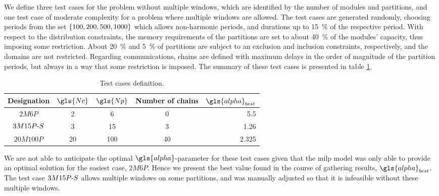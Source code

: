 \documentclass[main.tex]{subfiles}
\begin{document}
We define three test cases for the problem without multiple windows, which are identified by the number of modules and partitions, and one test case of moderate complexity for a problem where multiple windows are allowed.
The test cases are generated randomly, choosing periods from the set $\{100, 200, 500, 1000\}$ which allows non-harmonic periods, and durations up to \SI{15}{\percent} of the respective period.
With respect to the distribution constraints, the memory requirements of the partitions are set to about \SI{40}{\percent} of the modules' capacity, thus imposing some restriction.
About \SI{20}{\percent} and \SI{5}{\percent} of partitions are subject to an exclusion and inclusion constraints, respectively, and the domains are not restricted.
Regarding communications, chains are defined with maximum delays in the order of magnitude of the partition periods, but always in a way that some restriction is imposed.
The summary of these test cases is presented in table \ref{tab:cases}.
\begin{table}[htbp]
\centering
\caption{Test cases definition.}
\label{tab:cases}
\begin{tabular}{c c c c r}
    \toprule
    Designation & $\gls{Nc}$ & $\gls{Np}$ & Number of chains & $\gls{alpha}_{best}$ \\
    \midrule
    $2M6P$             & \num{2}  & \num{6}   & \num{0}  & \num{5.5}   \\
    $3M15P\text{-} S$ & \num{3}  & \num{15}  & \num{3}  & \num{1.26}  \\
    $20M100P$          & \num{20} & \num{100} & \num{40} & \num{2.325} \\
    \bottomrule
\end{tabular}
\end{table}
We are not able to anticipate the optimal $\gls{alpha}$-parameter for these test cases given that the \gls{milp} model was only able to provide an optimal solution for the easiest case, $2M6P$.
Hence we present the best value found in the course of gathering results, $\gls{alpha}_{best}$.
The test case $3M15P\text{-} S$ allows multiple windows on some partitions, and was manually adjusted so that it is infeasible without these multiple windows.
\end{document}
